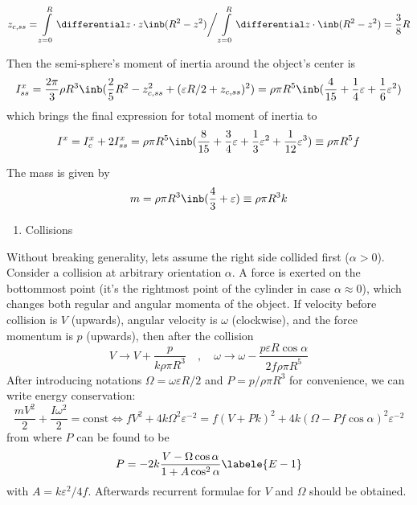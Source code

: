 \begin{equation}
    z_{c,ss} =
    \int\limits_{z=0}^{R}\differential z \cdot z \inb({R^2 - z^2}) \bigg/
    \int\limits_{z=0}^{R}\differential z \cdot \inb({R^2 - z^2}) = \frac{3}{8}R
\end{equation}

Then the semi-sphere's moment of inertia around the object's center is
\begin{equation}
    I_{ss}^x = \frac{2\pi}{3}\rho R^3 \inb({\frac{2}{5}R^2 - z_{c,ss}^2
    + (\varepsilon R / 2 + z_{c,ss})^2}) = \rho \pi R^5
    \inb({\frac{4}{15}+\frac{1}{4}\varepsilon+\frac{1}{6}\varepsilon^2}) 
\end{equation}
which brings the final expression for total moment of inertia to
\begin{equation}
    I^x = I_c^x + 2 I_{ss}^x = \rho \pi R^5
    \inb({\frac{8}{15} + \frac{3}{4}\varepsilon
        + \frac{1}{3}\varepsilon^2 + \frac{1}{12}\varepsilon^3 })
    \equiv \rho \pi R^5 f
\end{equation}

The mass is given by
\begin{equation}
    m = \rho \pi R^3 \inb({\frac{4}{3} + \varepsilon}) \equiv \rho \pi R^3 k
\end{equation}

{\bfseries
\begin{enumerate}
    \setcounter{enumi}{0}
    \item Collisions
\end{enumerate}
}

Without breaking generality, lets assume the right side collided first ($\alpha>0$).
Consider a collision at arbitrary orientation $\alpha$.
A force is exerted on the bottommost point
(it's the rightmost point of the cylinder in case $\alpha \approx 0$),
which changes both regular and angular momenta of the object.
If velocity before collision is $V$ (upwards),
angular velocity is $\omega$ (clockwise),
and the force momentum is $p$ (upwards), then after the collision
\begin{equation}
    V \rightarrow V + \frac{p} {k \rho \pi R^3} \quad,\quad
    \omega \rightarrow \omega - \frac{p \varepsilon R \cos\alpha} {2f\rho \pi R^5}
\end{equation}
After introducing notations $\Omega = \omega \varepsilon R / 2$ and
$P=p/\rho\pi R^3$ for convenience, we can write energy conservation:
\begin{equation}
    \frac{mV^2}{2}+\frac{I\omega^2}{2}=\text{const} \Leftrightarrow
    f V^2+4 k \Omega^2 \varepsilon^{-2}  = 
    f(V+Pk)^2+4k(\Omega-Pf\cos\alpha)^2 \varepsilon^{-2}
\end{equation}
from where $P$ can be found to be
\begin{equation}
    P=-2k\frac{V-\Omega\cos\alpha}{1+A\cos^2\alpha}
    \labele{E-1}
\end{equation}
with $A = k\varepsilon^2/4f$.
Afterwards recurrent formulae for $V$ and $\Omega$ should be obtained.

